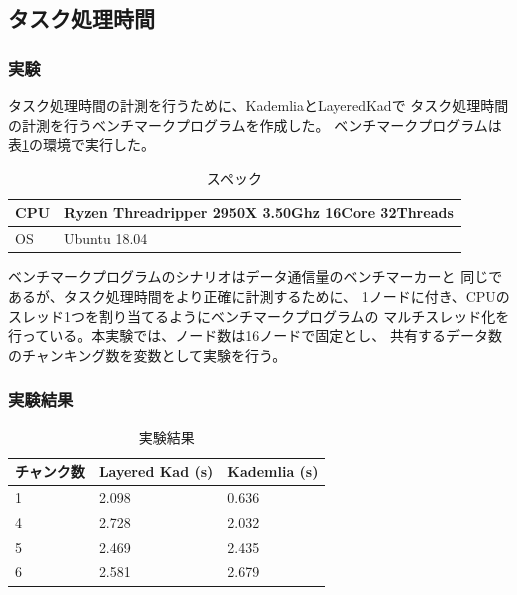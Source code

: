 \documentclass[sotsuron]{jcsie}
\begin{document}
\subsection{タスク処理時間}
\subsubsection{実験}
タスク処理時間の計測を行うために、KademliaとLayeredKadで
タスク処理時間の計測を行うベンチマークプログラムを作成した。
ベンチマークプログラムは表\ref{table:spec-ryzen}の環境で実行した。

\begin{table}[H]
	\caption{スペック}	
	\centering
	\label{table:spec-ryzen}
	\begin{tabular}{|l|l|}
		\hline
		CPU &   
		Ryzen Threadripper 2950X 3.50Ghz 16Core 32Threads \\ 
		\hline	
		OS  &   
		Ubuntu 18.04 \\ 
		\hline
	\end{tabular}	
\end{table}

ベンチマークプログラムのシナリオはデータ通信量のベンチマーカーと
同じであるが、タスク処理時間をより正確に計測するために、
1ノードに付き、CPUのスレッド1つを割り当てるようにベンチマークプログラムの
マルチスレッド化を行っている。本実験では、ノード数は16ノードで固定とし、
共有するデータ数のチャンキング数を変数として実験を行う。

\subsubsection{実験結果}
\begin{table}[H]
	\caption{実験結果}	
	\centering
	\label{table:calc-result}
	\begin{tabular}{|l|l|l|}
		\hline
		チャンク数 &   
		Layered Kad (s) &   
		Kademlia (s)\\ 
		\hline
		1               &   
		2.098           &   
		0.636\\
		\hline
		4               &   
		2.728           &   
		2.032\\
		\hline
		5               &   
		2.469           &   
		2.435\\
		\hline
		6               &   
		2.581           &   
		2.679\\
		\hline
	\end{tabular}	
\end{table}
\end{document}
